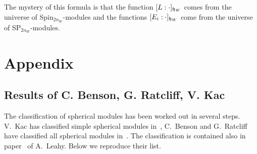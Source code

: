 \documentclass[12pt]{amsart}
\theoremstyle{definition}\newtheorem{theorem}{Theorem}[section]
\theoremstyle{definition}\newtheorem{definition}[proposition]{Definition}
\theoremstyle{remark}\newtheorem{example}[proposition]{Example}
\newcounter{AP}
\begin{document}
The mystery of this formula is that the function $[L:\cdot]_{\frak h_W}$ comes from the universe of Spin$_{2n_W}$-modules and the functions $[E_i:\cdot]_{\frak h_W}$ come from the universe of SP$_{2n_W}$-modules.
\newpage\section{Appendix}\label{SAP}
\subsection{Results of C. Benson, G. Ratcliff, V. Kac} The classification of spherical modules has been worked out in several steps. V.~Kac has classified simple spherical modules in~\cite{Kc}, C.~Benson and G.~Ratcliff have classified all spherical modules in~\cite{BR}. The classification is contained also in paper~\cite{Le} of A.~Leahy. Below we reproduce their list.
\end{document}
